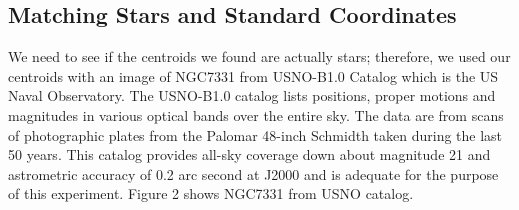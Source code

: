 \documentclass[letterpaper,12pt]{article}
\begin{document}
                                                                                                                                                                                                                                                                                                                                                                                                                                                                                                                                                                                                                                                                                                                                                                                                                                                                                                                                                                                                                                                                         \subsection{Matching Stars and Standard Coordinates}        
We need to see if the centroids we found are actually stars; therefore, we used our centroids with an image of NGC7331 from USNO-B1.0 Catalog which is the US Naval Observatory. The USNO-B1.0 catalog lists positions, proper motions and magnitudes in various optical bands over the entire sky. The data are from scans of photographic plates from the Palomar 48-inch Schmidth taken during the last 50 years. This catalog provides all-sky coverage down about magnitude 21 and astrometric accuracy of 0.2 arc second at J2000 and is adequate for the purpose of this experiment. Figure 2 shows NGC7331 from USNO catalog.
  
\end{document}
